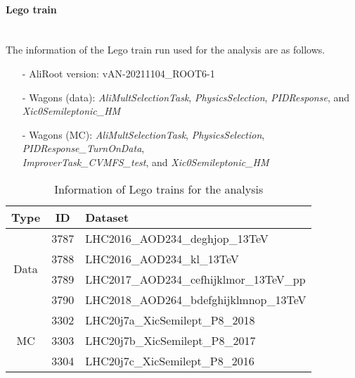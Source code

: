\paragraph{Lego train}\mbox{}\\
The information of the Lego train run used for the analysis are as follows.
%
\begin{itemize}
    \small
    \item[]  \vspace{1pt}
    \item[-] AliRoot version: vAN-20211104\_ROOT6-1
    \item[-] Wagons (data): \textit{AliMultSelectionTask}, \textit{PhysicsSelection}, \textit{PIDResponse}, and \textit{Xic0Semileptonic\_HM}
    \item[-] Wagons (MC): \textit{AliMultSelectionTask}, \textit{PhysicsSelection}, \textit{PIDResponse\_TurnOnData},\\ \textit{ImproverTask\_CVMFS\_test}, and \textit{Xic0Semileptonic\_HM}
\end{itemize}
%
\begin{table}[h]
    \centering
    \small
    \begin{tabular}{c|c|l}
    \hline\hline
    Type & ID & Dataset \\\hline
    \multirow{4}{*}{Data}
    & 3787 & LHC2016\_AOD234\_deghjop\_13TeV \\
    & 3788 & LHC2016\_AOD234\_kl\_13TeV \\
    & 3789 & LHC2017\_AOD234\_cefhijklmor\_13TeV\_pp \\
    & 3790 & LHC2018\_AOD264\_bdefghijklmnop\_13TeV \\\hline
    \multirow{3}{*}{MC}
    & 3302 & LHC20j7a\_XicSemilept\_P8\_2018 \\
    & 3303 & LHC20j7b\_XicSemilept\_P8\_2017 \\
    & 3304 & LHC20j7c\_XicSemilept\_P8\_2016 \\
    \hline\hline
    \end{tabular}
    \caption{Information of Lego trains for the analysis}
    \label{tab:lego}
\end{table}